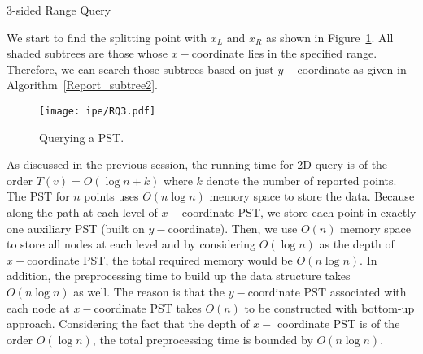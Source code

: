 \begin{algorithm}[h!]
\caption{3-sided Range Query}
\label{3-sided}
\begin{algorithmic}[1]
 
        \State {}
    \EndIf
    \Else
    \EndIf
\EndWhile
        \State {}
    \EndIf

   
        \State {}
    \EndIf
        \State {}
    \Else
    \EndIf
\EndWhile
{}

   
        \State {}
    \EndIf
        \State {}
    \Else
    \EndIf
\EndWhile
\EndFunction
\end{algorithmic}
\end{algorithm}

We start to find the splitting point with $x_L$ and $x_R$ as shown in Figure~\ref{fig:PST3}. All shaded subtrees are those whose $x-$coordinate lies in the specified range. Therefore, we can search those subtrees based on just $y-$coordinate as given in Algorithm~\ref{Report_subtree2}. 

\begin{figure}[h!]
\begin{center}
  \texttt{[image: ipe/RQ3.pdf]}
  \vspace{-0.1in}
  \caption{Querying a PST.}
  \label{fig:PST3}
\end{center}
\end{figure}

As discussed in the previous session, the running time for 2D query is of the order $T(v) = O(\log n+k)$ where $k$ denote the number of reported points. The PST for $n$ points uses $O(n \log n)$ memory space to store the data. Because along the path at each level of $x-$coordinate PST, we store each point in exactly one auxiliary PST (built on $y-$coordinate). Then, we use $O(n)$ memory space to store all nodes at each level and by considering $O(\log n)$ as the depth of $x-$coordinate PST, the total required memory would be $O(n\log n)$. In addition, the preprocessing time to build up the data structure takes $O(n \log n)$ as well. The reason is that the $y-$coordinate PST associated with each node at $x-$coordinate PST takes $O(n)$ to be constructed with bottom-up approach. Considering the fact that the depth of $x-$ coordinate PST is of the order $O(\log n)$, the total preprocessing time is bounded by $O(n\log n)$.
